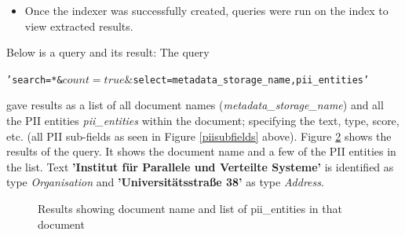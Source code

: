 \begin{itemize}
\begin{itemize}
\begin {figure}[h!h]
            \caption{Selected fields part-2}
            \label{selectedfields2}
        \end {figure}
        \clearpage
        \newpage
        \item Last step was 'Create an indexer'. Created an indexer named \textit{sampledata-indexer}. The user can also schedule how often an indexer should run in order to keep the index up to date.
    \end{itemize}
    \item Once the indexer was successfully created, queries were run on the index to view extracted results.
\end{itemize}
Below is a query and its result:
The query \\
\centerline{\texttt{'search=*\&$count=true\&$select=metadata\_storage\_name,pii\_entities'}}
gave results as a list of all document names (\textit{metadata\_storage\_name}) and all the \acs{PII} entities \textit{pii\_entities} within the document; specifying the text, type, score, etc. (all \acs{PII} sub-fields as seen in Figure \ref{piisubfields} above). Figure \ref{query1results} shows the results of the query. It shows the document name and a few of the \acs{PII} entities in the list. Text \textbf{'Institut für Parallele und Verteilte Systeme'} is identified as type \textit{Organisation} and \textbf{'Universitätsstraße 38'} as type \textit{Address}. 
\begin {figure}[h!h]
    \centering
    \caption{Results showing document name and list of pii\_entities in that document}
    \label{query1results}
\end {figure}

